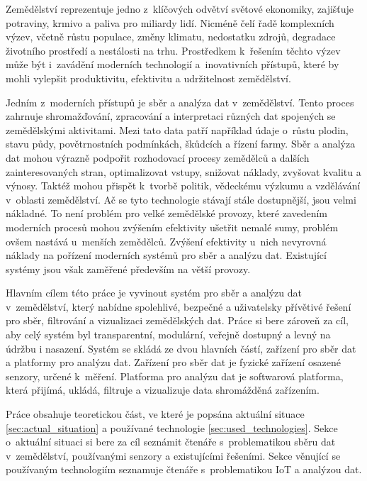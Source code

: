
Zemědělství reprezentuje jedno z~klíčových odvětví světové ekonomiky, zajišťuje potraviny, krmivo a paliva pro miliardy lidí. Nicméně čelí řadě komplexních výzev, včetně růstu populace, změny klimatu, nedostatku zdrojů, degradace životního prostředí a nestálosti na trhu. Prostředkem k~řešením těchto výzev může být i~zavádění moderních technologií a~inovativních přístupů, které by mohli vylepšit produktivitu, efektivitu a udržitelnost zemědělství.

Jedním z~moderních přístupů je sběr a analýza dat v~zemědělství. Tento proces zahrnuje shromažďování, zpracování a interpretaci různých dat spojených se zemědělskými aktivitami. Mezi tato data patří například údaje o~růstu plodin, stavu půdy, povětrnostních podmínkách, škůdcích a řízení farmy. Sběr a analýza dat mohou výrazně podpořit rozhodovací procesy zemědělců a dalších zainteresovaných stran, optimalizovat vstupy, snižovat náklady, zvyšovat kvalitu a výnosy. Taktéž mohou přispět k~tvorbě politik, vědeckému výzkumu a vzdělávání v~oblasti zemědělství. Ač se tyto technologie stávají stále dostupnější, jsou velmi nákladné. To není problém pro velké zemědělské provozy, které zavedením moderních procesů mohou zvýšením efektivity ušetřit nemalé sumy, problém ovšem nastává u~menších zemědělců. Zvýšení efektivity u~nich nevyrovná náklady na pořízení moderních systémů pro sběr a analýzu dat. Existující systémy jsou však zaměřené především na větší provozy.

Hlavním cílem této práce je vyvinout systém pro sběr a analýzu dat v~zemědělství, který nabídne spolehlivé, bezpečné a uživatelsky přívětivé řešení pro sběr, filtrování a vizualizaci zemědělských dat. Práce si bere zároveň za cíl, aby celý systém byl transparentní, modulární, veřejně dostupný a levný na údržbu i nasazení. Systém se skládá ze dvou hlavních částí, zařízení pro sběr dat a platformy pro analýzu dat. Zařízení pro sběr dat je fyzické zařízení osazené senzory, určené k~měření. Platforma pro analýzu dat je softwarová platforma, která přijímá, ukládá, filtruje a vizualizuje data shromážděná zařízením.

Práce obsahuje teoretickou část, ve které je popsána aktuální situace \ref{sec:actual_situation} a používané technologie \ref{sec:used_technologies}. Sekce o~aktuální situaci si bere za cíl seznámit čtenáře s~problematikou sběru dat v~zemědělství, používanými senzory a existujícími řešeními. Sekce věnující se používaným technologiím seznamuje čtenáře s~problematikou IoT a analýzou dat. 


